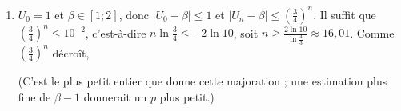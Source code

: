 \begin{description}
\begin{enumerate}
\begin{enumerate}
				\par\noindent{}
				Par récurrence immédiate (vrai pour $n = 0$ ; on multiplie par $\frac{3}{4}$ pour passer de $n$ à $n+1$) :
				\par\noindent{}
			\item {}
				$0 < \frac{3}{4} < 1$ donc $\left(\frac{3}{4}\right)^n \to 0$ et $|U_n - \beta| \to 0$.
				\par\noindent{}
		\end{enumerate}
		\item {}
			$U_0 = 1$ et $\beta \in [1;2]$, donc $|U_0 - \beta| \leq 1$ et $|U_n - \beta| \leq \left(\frac{3}{4}\right)^n$.
			Il suffit que $\left(\frac{3}{4}\right)^n \leq 10^{-2}$, c'est-à-dire $n \ln\frac{3}{4} \leq -2\ln 10$, soit
			$n \geq \frac{2\ln 10}{\ln\frac{4}{3}} \approx 16{,}01$.
			Comme $\left(\frac{3}{4}\right)^n$ décroît, \par\noindent{}
			(C'est le plus petit entier que donne cette majoration ; une estimation plus fine de $\beta - 1$ donnerait un $p$ plus petit.)
	\end{enumerate}
\end{description}
